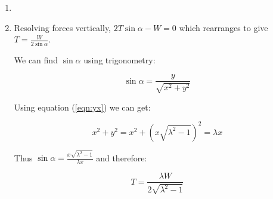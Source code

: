 \begin{problem}
{\begin{enumerate}
	   As $\lambda$ goes to $\sqrt{1 + \frac{h^2}{l^2}}$, $\sqrt{\lambda^2 -1}$ goes to $\frac{h}{l}$ and therefore $x$ and $y$ both go to zero. This equates to the banner sitting at the bottom end of the wire.
	   
	   As $\lambda$ goes to infinity,  $\sqrt{\lambda^2 -1}$ goes to $\lambda$ which is much greater than $h$, thus x goes to $\frac{l}{2}$, i.e. the banner sits half way between the buildings. At the same time $y$ goes to $\frac{\lambda l}{2}$, which means the banner hangs at half the height of the total length of wire. Both of these results correspond to the banner sitting directly in the middle of the wire.
	   
	     \item {}
	   
	   \item Resolving forces vertically, $2T\sin\alpha - W = 0$ which rearranges to give $T = \frac{W}{2\sin\alpha}$.
	   
	   We can find $\sin\alpha$ using trigonometry:
	   
	    \begin{equation*}	\sin\alpha = \frac{y}{\sqrt{x^2 + y^2}} \end{equation*}
	    
	    Using equation (\ref{eqn:yx}) we can get:
	    
	  \begin{equation*} x^2 + y^2 = x^2 + (x\sqrt{\lambda^2  -1})^2 = \lambda x \end{equation*}
	  
	  Thus $\sin\alpha = \frac{x\sqrt{\lambda^2  -1}}{\lambda x}$ and therefore:
	  
	  \begin{equation*} T = \frac{\lambda W}{2\sqrt{\lambda^2  -1}} \end{equation*}
	  
	  
	  

\end{enumerate}}
\end{problem}
